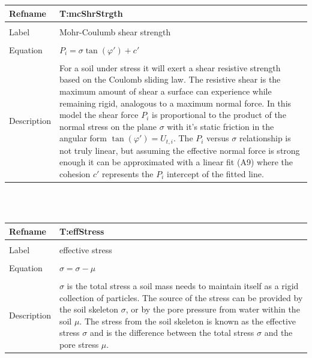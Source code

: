 \documentclass[12pt]{article}
\begin{document}
\noindent \begin{minipage}{\textwidth}
\begin{tabular}{p{} p{}}
\toprule \textbf{Refname} & \textbf{T:mcShrStrgth}
\label{T:mcShrStrgth}
\\ \midrule \\
Label & Mohr-Coulumb shear strength
\\ \midrule \\
Equation & $P_{i}=\sigma{}\tan\left(\varphi{}'\right)+c'$
\\ \midrule \\
Description & For a soil under stress it will exert a shear resistive strength based on the Coulomb sliding law. The resistive shear is the maximum amount of shear a surface can experience while remaining rigid, analogous to a maximum normal force. In this model the shear force $P_{i}$ is proportional to the product of the normal stress on the plane $\sigma{}$ with it's static friction in the angular form $\tan\left(\varphi{}'\right)=U_{t,i}$. The $P_{i}$ versus $\sigma{}$ relationship is not truly linear, but assuming the effective normal force is strong enough it can be approximated with a linear fit (A9) where the cohesion $c'$ represents the $P_{i}$ intercept of the fitted line.
\\ \bottomrule \end{tabular}
\end{minipage}\\
~\newline
\noindent \begin{minipage}{\textwidth}
\begin{tabular}{p{} p{}}
\toprule \textbf{Refname} & \textbf{T:effStress}
\label{T:effStress}
\\ \midrule \\
Label & effective stress
\\ \midrule \\
Equation & $\sigma{}=\sigma{}-\mu{}$
\\ \midrule \\
Description & $\sigma{}$ is the total stress a soil mass needs to maintain itself as a rigid collection of particles. The source of the stress can be provided by the soil skeleton $\sigma{}$, or by the pore pressure from water within the soil $\mu{}$. The stress from the soil skeleton is known as the effective stress $\sigma{}$ and is the difference between the total stress $\sigma{}$ and the pore stress $\mu{}$.
\\ \bottomrule \end{tabular}
\end{minipage}\\
\end{document}
